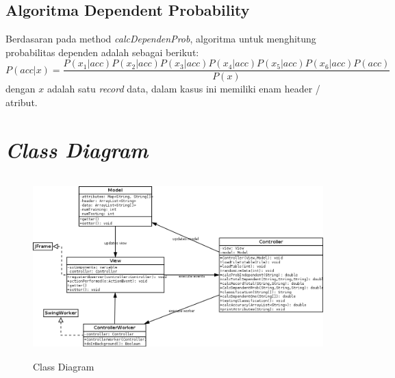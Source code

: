 \documentclass[11pt,a4paper]{report}
\begin{document}
	\subsection*{Algoritma Dependent Probability}
	Berdasaran pada method \emph{calcDependenProb}, algoritma untuk menghitung probabilitas dependen adalah sebagai berikut:
	\[ P(acc|x)=\frac{P(x_{1}|acc)P(x_{2}|acc)P(x_{3}|acc)P(x_{4}|acc)P(x_{5}|acc)P(x_{6}|acc)P(acc)}{P(x)} \]
	dengan $x$ adalah satu \emph{record} data, dalam kasus ini memiliki enam header / atribut. 
	\newpage
	
	\section*{\textit{Class Diagram}}
	\begin{figure}[h]
	\centering
	\includegraphics[width=13cm, height=7cm]{class}
	\caption{Class Diagram}
	\label{fig:class}
	\end{figure}
	
\end{document}
